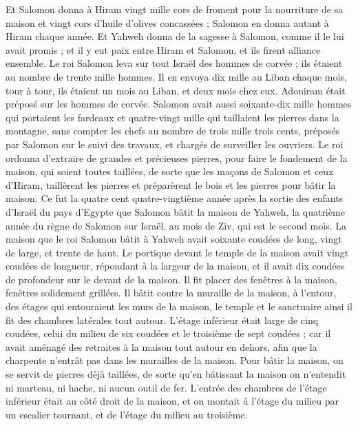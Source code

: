 \begin{multicols}{2}
Et Salomon donna à Hiram vingt mille cors de froment pour la nourriture de sa maison et vingt cors d'huile d’olives concassées ; Salomon en donna autant à Hiram chaque année.
Et Yahweh donna de la sagesse à Salomon, comme il le lui avait promis ; et il y eut paix entre Hiram et Salomon, et ils firent alliance ensemble.
Le roi Salomon leva sur tout Israël des hommes de corvée ; ils étaient au nombre de trente mille hommes.
Il en envoya dix mille au Liban chaque mois, tour à tour, ils étaient un mois au Liban, et deux mois chez eux. Adoniram était préposé sur les hommes de corvée.
Salomon avait aussi soixante-dix mille hommes qui portaient les fardeaux et quatre-vingt mille qui taillaient les pierres dans la montagne,
sans compter les chefs au nombre de trois mille trois cents, préposés par Salomon sur le suivi des travaux, et chargés de surveiller les ouvriers.
Le roi ordonna d’extraire de grandes et précieuses pierres, pour faire le fondement de la maison, qui soient toutes taillées,
de sorte que les maçons de Salomon et ceux d'Hiram, taillèrent les pierres et préparèrent le bois et les pierres pour bâtir la maison.
\VerseOne{}Ce fut la quatre cent quatre-vingtième année après la sortie des enfants d'Israël du pays d'Egypte que Salomon bâtit la maison de Yahweh, la quatrième année du règne de Salomon sur Israël, au mois de Ziv, qui est le second mois.
La maison que le roi Salomon bâtit à Yahweh avait soixante coudées de long, vingt de large, et trente de haut.
Le portique devant le temple de la maison avait vingt coudées de longueur, répondant à la largeur de la maison, et il avait dix coudées de profondeur sur le devant de la maison.
Il fit placer des fenêtres à la maison, fenêtres solidement grillées.
Il bâtit contre la muraille de la maison, à l’entour, des étages qui entouraient les murs de la maison, le temple et le sanctuaire ainsi il fit des chambres latérales tout autour.
L’étage inférieur était large de cinq coudées, celui du milieu de six coudées et le troisième de sept coudées ; car il avait aménagé des retraites à la maison tout autour en dehors, afin que la charpente n'entrât pas dans les murailles de la maison.
Pour bâtir la maison, on se servit de pierres déjà taillées, de sorte qu'en bâtissant la maison on n'entendit ni marteau, ni hache, ni aucun outil de fer.
L'entrée des chambres de l’étage inférieur était au côté droit de la maison, et on montait à l’étage du milieu par un escalier tournant, et de l’étage du milieu au troisième.

\end{multicols}
